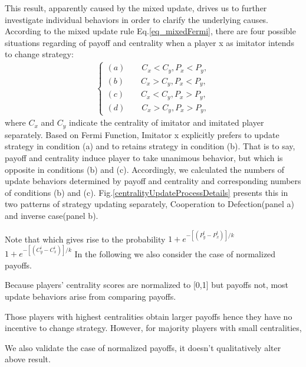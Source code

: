 \documentclass[preprint,12pt,3p]{elsarticle}
\begin{document}
    This result, apparently caused by the mixed update, drives us to further investigate individual
behaviors in order to clarify the underlying causes.
According to the mixed update rule Eq.\ref{eq_mixedFermi}, there are four possible situations regarding of payoff and centrality when a player x as imitator intends to change strategy:
\begin{eqnarray}
\left\{
\begin{aligned}
(a)\qquad C_x<C_y,P_x<P_y,\\
(b)\qquad C_x>C_y,P_x<P_y,\\
(c)\qquad C_x<C_y,P_x>P_y,\\
(d)\qquad C_x>C_y,P_x>P_y,
\end{aligned}
\right.
\label{eq_mixedupdate_conditions}
\end{eqnarray}
where $C_x$ and $C_y$ indicate the centrality of imitator and imitated player separately.
    Based on Fermi Function, Imitator x explicitly prefers to update strategy in condition (a)
and to retains strategy in condition (b).
That is to say, payoff and centrality induce player to take unanimous behavior,
but which is opposite in conditions (b) and (c).
    Accordingly, we calculated the numbers of update behaviors determined by payoff and centrality
and corresponding numbers of conditions (b) and (c).
Fig.\ref{centralityUpdateProcessDetails} presents this in two patterns of strategy updating separately,
Cooperation to Defection(panel a) and inverse case(panel b).

Note that
which gives rise to the probability
$1+e^{-[(P_y^t-P_x^t)]/k}$
$1+e^{-[(C^i_y-C^i_x)]/k}$
In the following we also consider the case of normalized payoffs.

Because players' centrality scores are normalized to [0,1] but payoffs not, most update behaviors arise from comparing payoffs.


Those players with highest centralities obtain larger payoffs hence they have no incentive to change strategy.
However, for majority players with small centralities,



We also validate the case of normalized payoffs, it doesn't qualitatively alter above result.
\end{document}
